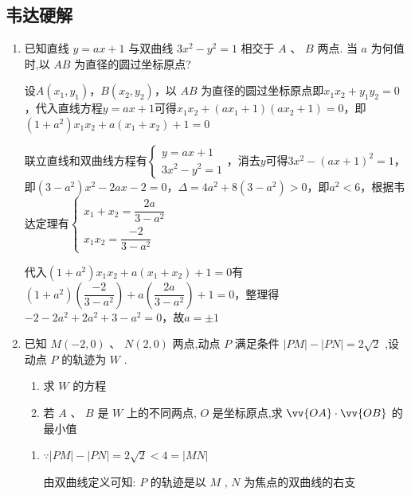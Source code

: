 \subsection*{韦达硬解}
\begin{enumerate}
    \item 已知直线 $y = {ax} + 1$ 与双曲线 $3{x}^{2} - {y}^{2} = 1$ 相交于 $A$ 、 $B$ 两点. 当 $a$ 为何值时,以 ${AB}$ 为直径的圆过坐标原点? 
    \begin{jieda}
        设$A(x_1, y_1)$，$B(x_2, y_2)$，以 ${AB}$ 为直径的圆过坐标原点即$x_1x_2+y_1y_2 = 0$，代入直线方程$y = {ax} + 1$可得$x_1x_2+({ax_1} + 1)({ax_2} + 1) = 0$，即$(1+a^2)x_1x_2 + a(x_1+x_2) + 1 = 0$

        联立直线和双曲线方程有$\left\{\begin{array}{l}
             y = {ax} + 1  \\
             3{x}^{2} - {y}^{2} = 1 
        \end{array}\right.$，消去$y$可得$3{x}^{2} - ({ax} + 1)^2 = 1 $，即$(3-a^2)x^2-2ax -2 = 0$，$\Delta = 4a^2+8(3-a^2) > 0$，即$a^2 < 6$，根据韦达定理有$\left\{\begin{array}{l}
             x_1+x_2 = \dfrac{2a}{3-a^2} \\
             x_1x_2 = \dfrac{-2}{3-a^2}
        \end{array}\right.$
        
        代入$(1+a^2)x_1x_2 + a(x_1+x_2) + 1 = 0$有$(1+a^2)\left(\dfrac{-2}{3-a^2}\right) + a\left(\dfrac{2a}{3-a^2}\right) + 1 = 0$，整理得$-2-2a^2+2a^2+3-a^2 = 0$，故$a = \pm 1$
    \end{jieda}
    \item 已知 $M\left( {-2,0}\right) \text{ 、 }N\left( {2,0}\right)$ 两点,动点 $P$ 满足条件 $\left| {PM}\right|  - \left| {PN}\right|  = 2\sqrt{2}$ ,设动点 $P$ 的轨迹为 $W$ . 
    \begin{enumerate}
        \item 求 $W$ 的方程
        \item 若 $A$ 、 $B$ 是 $W$ 上的不同两点, $O$ 是坐标原点,求 $\vv{OA} \cdot  \vv{OB}$ 的最小值
    \end{enumerate}
    \begin{jieda}
        \begin{enumerate}
            \item $\because \left| {PM}\right|  - \left| {PN}\right|  = 2\sqrt{2} < 4 = \left| {MN}\right|$
            
            由双曲线定义可知: $P$ 的轨迹是以 $M$ , $N$ 为焦点的双曲线的右支
            

\end{enumerate}
\end{jieda}
\end{enumerate}
